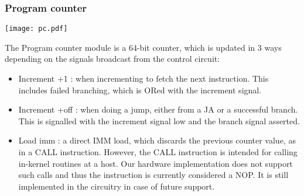 \documentclass{l4proj}
\begin{document}
\subsubsection{Program counter}
\begin{center}
\texttt{[image: pc.pdf]}\\
\end{center}
The Program counter module is a 64-bit counter, which is updated in 3 ways depending on the signals broadcast from the control circuit:
\begin{itemize}
    \item Increment +1 : when incrementing to fetch the next instruction. This includes failed branching, which is ORed with the increment signal.
    \item Increment +off : when doing a jump, either from a JA or a successful branch. This is signalled with the increment signal low and the branch signal asserted.
    \item Load imm : a direct IMM load, which discards the previous counter value, as in a CALL instruction. However, the CALL instruction is intended for calling in-kernel routines at a host. Our hardware implementation does not support such calls and thus the instruction is currently considered a NOP. It is still implemented in the circuitry in case of future support.
\end{itemize}

\newpage
\end{document}
